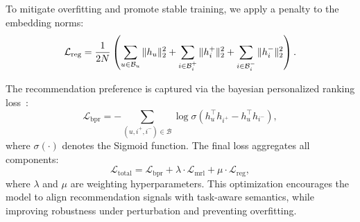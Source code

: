 \documentclass[letterpaper]{article} %
\begin{document}
To mitigate overfitting and promote stable training, we apply a penalty to the embedding norms:
\begin{equation}
\small
\mathcal{L}_{\text{reg}} = \frac{1}{2N} \left( \sum_{u \in \mathcal{B}_u} \| {h}_u \|_2^2 + \sum_{i \in \mathcal{B}_i^+} \| {h}_i^+ \|_2^2 + \sum_{i \in \mathcal{B}_i^-} \| {h}_i^- \|_2^2 \right).
\end{equation}

The recommendation preference is captured via the bayesian personalized ranking loss~\cite{rendle2012bpr}:
\begin{equation}
\mathcal{L}_{\text{bpr}} = - \sum_{(u, i^+, i^-) \in \mathcal{B}} \log \sigma({h}_u^\top {h}_{i^+} - {h}_u^\top {h}_{i^-}),
\end{equation}
where $\sigma(\cdot)$ denotes the Sigmoid function. The final loss aggregates all components:
\begin{equation}
\mathcal{L}_{\text{total}} = \mathcal{L}_{\text{bpr}} + \lambda \cdot \mathcal{L}_{\text{mrl}} + \mu \cdot \mathcal{L}_{\text{reg}},
\end{equation}
where $\lambda$ and $\mu$ are weighting hyperparameters. This optimization encourages the model to align recommendation signals with task-aware semantics, while improving robustness under perturbation and preventing overfitting.
\end{document}
